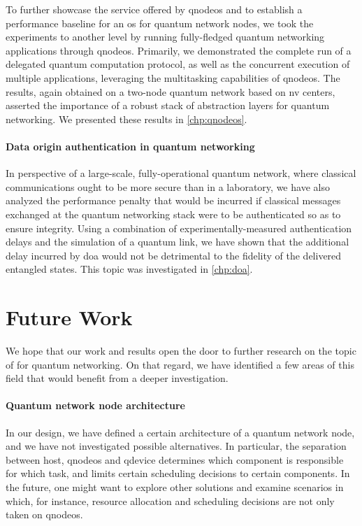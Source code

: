 To further showcase the service offered by \acrshort{qnodeos} and to establish a performance
baseline for an \acrshort{os} for quantum network nodes, we took the experiments to another level by
running fully-fledged quantum networking applications through \acrshort{qnodeos}. Primarily, we
demonstrated the complete run of a delegated quantum computation protocol, as well as the concurrent
execution of multiple applications, leveraging the multitasking capabilities of \acrshort{qnodeos}.
The results, again obtained on a two-node quantum network based on \acrshort{nv} centers, asserted
the importance of a robust stack of abstraction layers for quantum networking.  We presented these results in \cref{chp:qnodeos}.

\paragraph{Data origin authentication in quantum networking}

In perspective of a large-scale, fully-operational quantum network, where classical communications
ought to be more secure than in a laboratory, we have also analyzed the performance penalty that
would be incurred if classical messages exchanged at the quantum networking stack were to be
authenticated so as to ensure integrity. Using a combination of experimentally-measured
authentication delays and the simulation of a quantum link, we have shown that the additional delay
incurred by \acrlong{doa} would not be detrimental to the fidelity of the delivered entangled
states. This topic was investigated in \cref{chp:doa}.

\section{Future Work}

We hope that our work and results open the door to further research on the topic of 
for quantum networking. On that regard, we have identified a few areas of this field that would
benefit from a deeper investigation.

\paragraph{Quantum network node architecture}

In our design, we have defined a certain architecture of a quantum network node, and we have not
investigated possible alternatives. In particular, the separation between host, \acrshort{qnodeos}
and \acrshort{qdevice} determines which component is responsible for which task, and limits certain
scheduling decisions to certain components. In the future, one might want to explore other solutions
and examine scenarios in which, for instance, resource allocation and scheduling decisions are not
only taken on \acrshort{qnodeos}.

